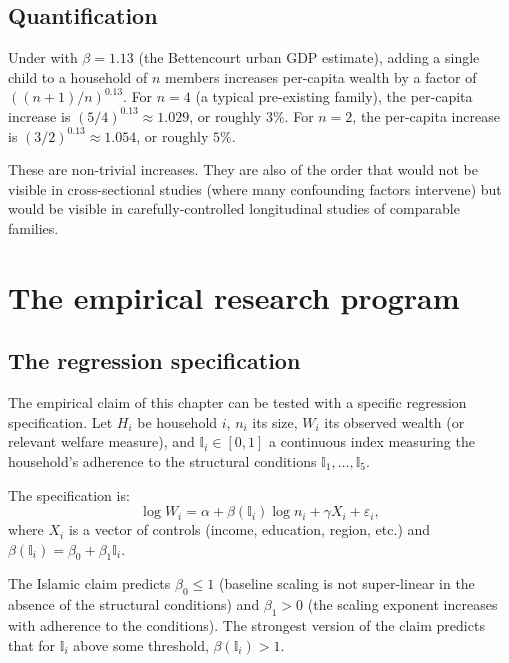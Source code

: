 \subsection{Quantification}

\begin{corollary}
\label{cor:magnitude}
Under  with $\beta = 1.13$ (the
Bettencourt urban GDP estimate), adding a single child to a
household of $n$ members increases per-capita wealth by a factor
of $((n+1)/n)^{0.13}$. For $n = 4$ (a typical pre-existing family),
the per-capita increase is $(5/4)^{0.13} \approx 1.029$, or roughly
$3\%$. For $n = 2$, the per-capita increase is $(3/2)^{0.13}
\approx 1.054$, or roughly $5\%$.
\end{corollary}

These are non-trivial increases. They are also of the order that
would not be visible in cross-sectional studies (where many
confounding factors intervene) but would be visible in carefully-controlled
longitudinal studies of comparable families.

\section{The empirical research program}
\label{sec:network-empirical}

\subsection{The regression specification}

The empirical claim of this chapter can be tested with a specific
regression specification. Let $H_i$ be household $i$, $n_i$ its
size, $W_i$ its observed wealth (or relevant welfare measure), and
$\mathbb{I}_i \in [0, 1]$ a continuous index measuring the
household's adherence to the structural conditions
$\mathbb{I}_1, \dots, \mathbb{I}_5$.

The specification is:
\[
    \log W_i = \alpha + \beta(\mathbb{I}_i) \log n_i + \gamma X_i + \varepsilon_i,
\]
where $X_i$ is a vector of controls (income, education, region,
etc.) and $\beta(\mathbb{I}_i) = \beta_0 + \beta_1 \mathbb{I}_i$.

The Islamic claim predicts $\beta_0 \leq 1$ (baseline scaling is
not super-linear in the absence of the structural conditions) and
$\beta_1 > 0$ (the scaling exponent increases with adherence to the
conditions). The strongest version of the claim predicts that for
$\mathbb{I}_i$ above some threshold, $\beta(\mathbb{I}_i) > 1$.

